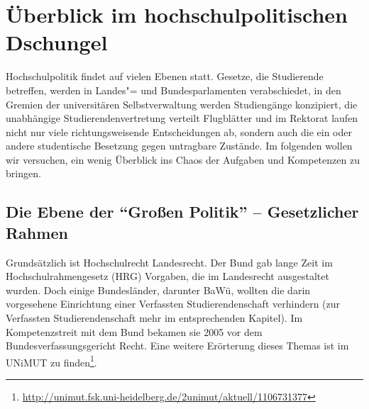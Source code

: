 \section{Überblick im hochschulpolitischen Dschungel}
\label{hopo}

Hochschulpolitik findet auf vielen Ebenen statt. Gesetze, die Studierende betreffen, werden in Landes"= und Bundesparlamenten verabschiedet, in den Gremien der universitären Selbstverwaltung werden Studiengänge konzipiert, die unabhängige Studierendenvertretung verteilt Flugblätter und im Rektorat laufen nicht nur viele richtungsweisende Entscheidungen ab, sondern auch die ein oder andere studentische Besetzung gegen untragbare Zustände.
Im folgenden wollen wir versuchen, ein wenig Überblick ins Chaos der Aufgaben und Kompetenzen zu bringen.

\subsection{Die Ebene der "`Großen Politik"' -- Gesetzlicher Rahmen}
Grundsätzlich ist Hochschulrecht Landesrecht. Der Bund gab lange Zeit im Hochschulrahmengesetz (HRG) Vorgaben, die im Landesrecht ausgestaltet
wurden. Doch einige Bundesländer, darunter BaWü, wollten die darin vorgesehene Einrichtung einer Verfassten Studierendenschaft verhindern (zur Verfassten Studierendenschaft mehr im entsprechenden Kapitel). Im Kompetenzstreit mit dem Bund bekamen sie 2005 vor dem Bundesverfassungsgericht Recht. Eine weitere Erörterung dieses Themas ist im UNiMUT zu finden\footnote{\url{http://unimut.fsk.uni-heidelberg.de/2unimut/aktuell/1106731377}}.

